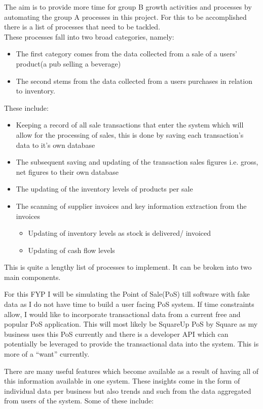 \begin{flushleft}
	The aim is to provide more time for group B growth activities and processes by automating the group A processes in this project. For this to be accomplished there is a list of processes that 
	need to be tackled. \\ These processes fall into two broad categories, namely:
	\begin{itemize}
		\item The first category comes from the data collected from a sale of a users' product(a pub selling a beverage)
		\item The second stems from the data collected from a users purchases in relation to inventory.
		\end{itemize}
	These include:
	\begin{itemize}
		\item Keeping a record of all sale transactions that enter the system which will allow for the processing of sales, this is done by saving each transaction’s data to it’s own database
		\item The subsequent saving and updating of the transaction sales figures i.e. gross, net figures to their own database
		\item The updating of the inventory levels of products per sale
		\item The scanning of supplier invoices and key information extraction from the invoices
		\begin{itemize}
			      \item Updating of inventory levels as stock is delivered/ invoiced
			      \item Updating of cash flow levels
		      \end{itemize}
	\end{itemize}

	This is quite a lengthy list of processes to implement. It can be broken into two main components. 

	 For this FYP I will be simulating the Point of Sale(PoS) till software with fake data as I do not have time to build a user facing PoS system.
	If time constraints allow, I would like to incorporate transactional data from a current free and popular PoS application. This will most likely be SquareUp PoS by Square as my business uses this PoS currently and there is a developer API which can potentially be leveraged to provide the transactional data into the system. This is more of a “want” currently.

	There are many useful features which become available as a result of having all of this information available in one system. These insights come in the form of individual data per business but also trends and such from the data aggregated from users of the system. Some of these include:


\end{flushleft}
